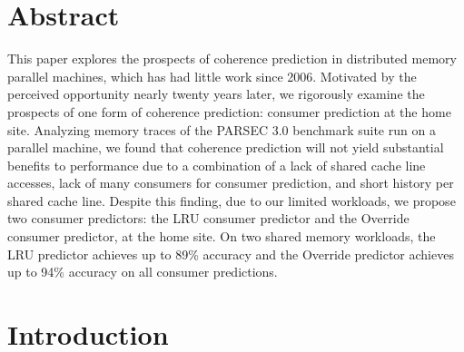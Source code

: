 \section*{Abstract}
    This paper explores the prospects of coherence prediction in distributed memory parallel machines, which has had little work since 2006. Motivated by the perceived opportunity nearly twenty years later, we rigorously examine the prospects of one form of coherence prediction: consumer prediction at the home site. Analyzing memory traces of the PARSEC 3.0 benchmark suite run on a parallel machine, we found that coherence prediction will not yield substantial benefits to performance due to a combination of a lack of shared cache line accesses, lack of many consumers for consumer prediction, and short history per shared cache line. Despite this finding, due to our limited workloads, we propose two consumer predictors: the LRU consumer predictor and the Override consumer predictor, at the home site. On two shared memory workloads, the LRU predictor achieves up to 89\% accuracy and the Override predictor achieves up to 94\% accuracy on all consumer predictions.

\section{Introduction}

